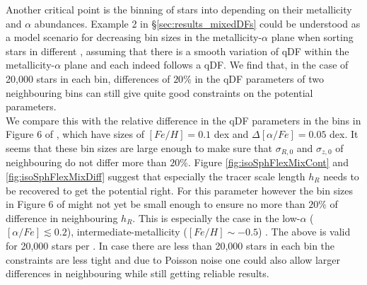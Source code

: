  Another critical point is the binning of stars into \MAPs depending on their metallicity and $\alpha$ abundances. Example 2 in \S\ref{sec:results_mixedDFs} could be understood as a model scenario for decreasing bin sizes in the metallicity-$\alpha$ plane when sorting stars in different \MAPs, assuming that there is a smooth variation of qDF within the metallicity-$\alpha$ plane and each \MAP indeed follows a qDF. We find that, in the case of 20,000 stars in each bin, differences of $20\%$ in the qDF parameters of two neighbouring bins can still give quite good constraints on the potential parameters. 
\\We compare this with the relative difference in the qDF parameters in the bins in Figure 6 of \cite{bov13}, which have sizes of $[Fe/H] = 0.1$ dex and $\Delta [\alpha/Fe] = 0.05$ dex. It seems that these bin sizes are large enough to make sure that $\sigma_{R,0}$ and $\sigma_{z,0}$ of neighbouring \MAPs do not differ more than $20\%$. Figure \ref{fig:isoSphFlexMixCont} and \ref{fig:isoSphFlexMixDiff} suggest that especially the tracer scale length $h_R$ needs to be recovered to get the potential right. For this parameter however the bin sizes in Figure 6 of \cite{bov13} might not yet be small enough to ensure no more than $20\%$ of difference in neighbouring $h_R$. This is especially the case in the low-$\alpha$ ($[\alpha/Fe] \lesssim 0.2$), intermediate-metallicity ($[Fe/H] \sim -0.5$) \MAPs. The above is valid for 20,000 stars per \MAP. In case there are less than 20,000 stars in each bin the constraints are less tight and due to Poisson noise one could also allow larger differences in neighbouring \MAPs while still getting reliable results.

